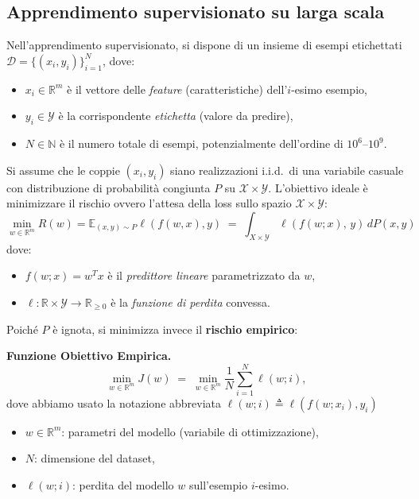 \documentclass[a4paper,12pt]{article}
\numberwithin{equation}{section}
\numberwithin{figure}{section}
\numberwithin{table}{section}
\newcommand{\R}{\mathbb{R}}
\begin{document}
\subsection{Apprendimento supervisionato su larga scala}

Nell'apprendimento supervisionato, si dispone di un insieme di esempi etichettati $\mathcal{D} = \{(x_i, y_i)\}_{i=1}^N$, dove:
\begin{itemize}
    \item $x_i \in \R^m$ \`e il vettore delle \emph{feature} (caratteristiche) dell'$i$-esimo esempio,
    \item $y_i \in \mathcal{Y}$ \`e la corrispondente \emph{etichetta} (valore da predire),
    \item $N \in \mathbb{N}$ \`e il numero totale di esempi, potenzialmente dell'ordine di $10^6$--$10^9$.
\end{itemize}

Si assume che le coppie $(x_i, y_i)$ siano realizzazioni i.i.d.\ di una variabile casuale con distribuzione di probabilit\`a congiunta $P$ su $\mathcal{X} \times \mathcal{Y}$. L'obiettivo ideale \`e minimizzare il rischio ovvero l'attesa della loss sullo spazio $\mathcal{X}\times\mathcal{Y}$:
\[
  \min_{w \in \R^m}{R}(w)=\mathbb{E}_{(x,y)\sim P}\ell(f(w,x),y) \;=\; \int_{{X} \times \mathcal{Y}} \ell\!\left(f(w;x),\, y\right) \, dP(x,y)
\]
dove:
\begin{itemize}
    \item $f(w;x) = w^T x$ \`e il \emph{predittore lineare} parametrizzato da $w$,
    \item $\ell: \R \times \mathcal{Y} \to \R_{\geq 0}$ \`e la \emph{funzione di perdita} convessa.
\end{itemize}

Poich\'e $P$ \`e ignota, si minimizza invece il \textbf{rischio empirico}:

\begin{definitionbox}
  \textbf{Funzione Obiettivo Empirica.}
  \begin{equation}\label{eq:empirical_risk}
    \min_{w \in \R^m} J(w) \;=\; \min_{w \in \R^m}\frac{1}{N} \sum_{i=1}^{N} \ell(w; i),
  \end{equation}
  dove abbiamo usato la notazione abbreviata $\ell(w;i) \triangleq \ell(f(w;x_i), y_i)$
  \begin{itemize}
    \item $w \in \R^m$: parametri del modello (variabile di ottimizzazione),
    \item $N$: dimensione del dataset,
    \item $\ell(w;i)$: perdita del modello $w$ sull'esempio $i$-esimo.
  \end{itemize}
\end{definitionbox}
\end{document}
